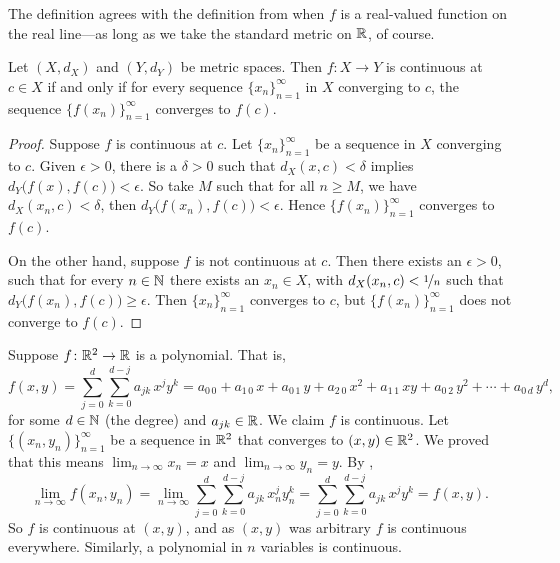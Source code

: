 The definition agrees with the definition from  when
$f$ is a real-valued function on the real line---as long as we take the standard
metric on ${\mathbb{R}}$, of course.

\begin{prop} \label{prop:contiscont}
Let $(X,d_X)$ and $(Y,d_Y)$ be metric spaces.
Then $f \colon X \to Y$ is
continuous at $c \in X$
if and only if for every sequence $\{ x_n \}_{n=1}^\infty$ in $X$
converging to $c$, the sequence $\bigl\{ f(x_n) \bigr\}_{n=1}^\infty$ converges
to $f(c)$.
\end{prop}

\begin{proof}
Suppose $f$ is continuous at $c$.  Let $\{ x_n \}_{n=1}^\infty$ be a
sequence in $X$ converging to $c$.  Given $\epsilon > 0$,
there is a $\delta > 0$ such that $d_X(x,c) < \delta$ implies
$d_Y\bigl(f(x),f(c)\bigr) < \epsilon$.  So take $M$ such that
for all $n \geq M$, we have $d_X(x_n,c) < \delta$, then
$d_Y\bigl(f(x_n),f(c)\bigr) < \epsilon$.  Hence $\bigl\{ f(x_n) \bigr\}_{n=1}^\infty$
converges to $f(c)$.

On the other hand, suppose $f$ is not continuous at $c$.
Then there exists an $\epsilon > 0$,
such that for every $n \in {\mathbb{N}}$ there exists an $x_n \in X$,
with
$d_X(x_n,c) < \nicefrac{1}{n}$ such that $d_Y\bigl(f(x_n),f(c)\bigr) \geq
\epsilon$.  Then $\{ x_n \}_{n=1}^\infty$ converges to $c$, but
$\bigl\{ f(x_n) \bigr\}_{n=1}^\infty$
does not converge to $f(c)$.
\end{proof}

\begin{example}
Suppose $f \colon {\mathbb{R}}^2 \to {\mathbb{R}}$ is a polynomial.  That is,
\begin{equation*}
f(x,y) =
\sum_{j=0}^d
\sum_{k=0}^{d-j}
a_{jk}\,x^jy^k =
a_{0\,0} + a_{1\,0} \, x +
a_{0\,1} \, y+  
a_{2\,0} \, x^2+  
a_{1\,1} \, xy+  
a_{0\,2} \, y^2+ \cdots +
a_{0\,d} \, y^d ,
\end{equation*}
for some $d \in {\mathbb{N}}$ (the degree) and $a_{jk} \in {\mathbb{R}}$.  We claim 
$f$ is continuous.  Let $\bigl\{ (x_n,y_n) \bigr\}_{n=1}^\infty$ be a sequence
in ${\mathbb{R}}^2$ that converges to $(x,y) \in {\mathbb{R}}^2$.  We proved that this
means $\lim_{n\to\infty} x_n = x$ and $\lim_{n\to\infty} y_n = y$.
By ,
\begin{equation*}
\lim_{n\to\infty}
f(x_n,y_n) =
\lim_{n\to\infty}
\sum_{j=0}^d
\sum_{k=0}^{d-j}
a_{jk} \, x_n^jy_n^k 
=
\sum_{j=0}^d
\sum_{k=0}^{d-j}
a_{jk} \, x^jy^k
=
f(x,y) .
\end{equation*}
So $f$ is continuous at $(x,y)$, and as $(x,y)$ was arbitrary $f$ is
continuous everywhere.  Similarly, a
polynomial in $n$ variables is continuous.
\end{example}

